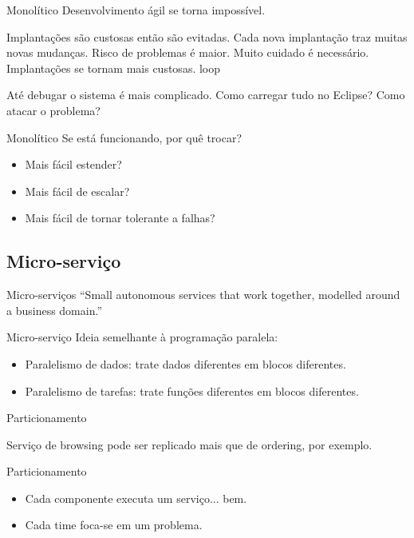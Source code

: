 \begin{frame}{Monolítico}
Desenvolvimento ágil se torna impossível. 

Implantações são custosas então são evitadas. Cada nova implantação traz muitas novas mudanças. Risco de problemas é maior. Muito cuidado é necessário. Implantações se tornam mais custosas. loop

Até debugar o sistema é mais complicado. Como carregar tudo no Eclipse? \pause Como atacar o problema?
\end{frame}

\begin{frame}{Monolítico}
Se está funcionando, por quê trocar?

\pause

\begin{itemize}
	\item Mais fácil estender?
	\item Mais fácil de escalar?
	\item Mais fácil de tornar tolerante a falhas?
\end{itemize}
\end{frame}


\subsection{Micro-serviço}

\begin{frame}{Micro-serviços}
``Small autonomous services that work together, modelled around a business domain.''
\end{frame}

\begin{frame}{Micro-serviço}
Ideia semelhante à programação paralela:
\begin{itemize}
	\item Paralelismo de dados: trate dados diferentes em blocos diferentes.
	\item Paralelismo de tarefas: trate funções diferentes em blocos diferentes.
\end{itemize}

\pause\alert{Particionamento}
\end{frame}

Serviço de browsing pode ser replicado mais que de ordering, por exemplo.

\begin{frame}{Particionamento}
\begin{itemize}
	\item Cada componente executa um serviço... bem.
	\item Cada time foca-se em um problema.
\end{itemize}
\end{frame}

